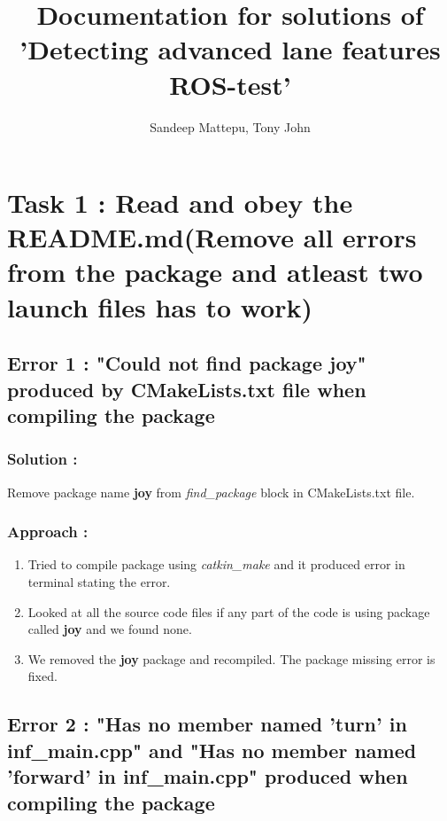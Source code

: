 \documentclass[12pt]{article}
\title{Documentation for solutions of 'Detecting advanced lane features ROS-test'}
\author{Sandeep Mattepu, Tony John}
\date{}
\begin{document}
	


\maketitle

\tableofcontents


\section{Task 1 : Read and obey the README.md(Remove all errors from the package and atleast two launch files has to work)}


\subsection{Error 1 : "Could not find package joy" produced by CMakeLists.txt file when compiling the package}

\subsubsection{Solution : }
Remove package name \textbf{joy} from \textit{find\_package} block in CMakeLists.txt file.

\subsubsection{Approach :}
\begin{enumerate}
\item Tried to compile package using \textit{catkin\_make} and it produced error in terminal stating the error.
\item Looked at all the source code files if any part of the code is using package called \textbf{joy} and we found none.
\item We removed the \textbf{joy} package and recompiled. The package missing error is fixed.
\end{enumerate}


\subsection{Error 2 : "Has no member named 'turn' in inf\_main.cpp" and "Has no member named 'forward' in inf\_main.cpp" produced when compiling the package}
\end{document}
